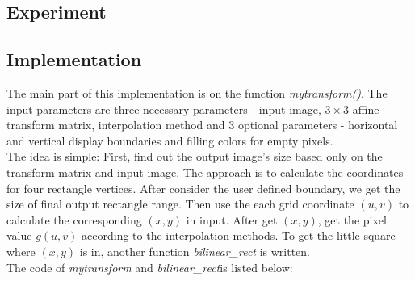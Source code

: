 \subsection{Experiment}



\subsection{Implementation}
The main part of this implementation is on the function \emph{mytransform()}. The input parameters are three necessary parameters - input image, $3\times 3$ affine transform matrix, interpolation method and 3 optional parameters - horizontal and vertical display boundaries and filling colors for empty pixels. \\
The idea is simple: First, find out the output image's size based only on the transform matrix and input image. The approach is to calculate the coordinates for four rectangle vertices. After consider the user defined boundary, we get the size of final output rectangle range. Then use the each grid coordinate $(u,v)$ to calculate the corresponding $(x,y)$ in input. After get $(x,y)$, get the pixel value $g(u,v)$ according to the interpolation methods. To get the little square where $(x,y)$ is in, another function \emph{bilinear_rect} is written.\\
The code of \emph{mytransform} and \emph{bilinear_rect}is listed below:
\lstset{language=Matlab}
